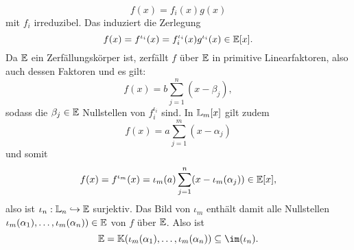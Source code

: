 \begin{beweis}
\begin{equation}
f(x) = f_i(x) g(x)
\end{equation}
mit $f_i$ irreduzibel. Das induziert die Zerlegung
\begin{equation}
f(x) = f^{\iota_i}(x) = f_i^{\iota_i} (x) g^{\iota_i} (x) \in \mathbb{E}[x].
\end{equation}
Da $\mathbb{E}$ ein Zerfällungskörper ist, zerfällt $f$ über $\mathbb{E}$ in primitive Linearfaktoren, also auch dessen Faktoren und es gilt:
\begin{equation}
f(x)= b \sum_{j=1}^n (x-\beta_j), 
\end{equation}
sodass die $\beta_j \in \mathbb{E}$ Nullstellen von $f_i^{\iota_i}$ sind. In $\mathbb{L}_m[x]$ gilt zudem
\begin{equation}
f(x) = a \sum_{j=1}^m (x-\alpha_j)
\end{equation} 
und somit
\begin{equation}
f(x) = f^{\iota_m}(x) = \iota_m(a) \sum_{j=1}^n (x-\iota_m(\alpha_j)) \in \mathbb{E}[x], 
\end{equation}
also ist $\iota_n: \mathbb{L}_n \hookrightarrow \mathbb{E}$ surjektiv. Das Bild von $\iota_m$ enthält damit alle Nullstellen $\iota_m(\alpha_1), \dots, \iota_m(\alpha_n)) \in \mathbb{E}$ von $f$ über $\mathbb{E}$. Also ist
\begin{equation}
\E = \K(\iota_m(\alpha_1), \dots, \iota_m(\alpha_n)) \sub \im(\iota_n).
\end{equation} 
\end{beweis}